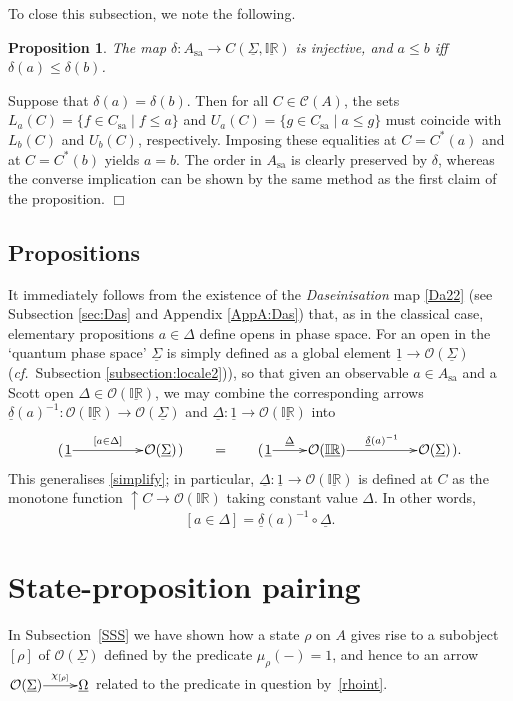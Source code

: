 \documentclass[11pt]{article}
\newcommand{\IR}{\mathbb{IR}}
\newcommand{\uIR}{\underline{\mathbb{IR}}}
\newcommand{\beq}{\begin{equation}}
\newcommand{\eeq}{\end{equation}}
\newcommand{\raw}{\rightarrow} \newcommand{\rat}{\mapsto}
\newcommand{\inv}{^{-1}}
\newcommand{\er}{\eqref}
\newcommand{\dl}{\delta} \newcommand{\Dl}{\Delta}
\newcommand{\rh}{\rho} \newcommand{\sg}{\sigma}
\newcommand{\ch}{\chi} \newcommand{\ps}{\psi} \newcommand{\Ps}{\Psi}
\newcommand{\CA}{{\mathcal A}} \newcommand{\CB}{{\mathcal B}}
\newcommand{\CO}{{\mathcal O}} \newcommand{\CP}{{\mathcal P}}
\newcommand{\alg}[1]{\ensuremath{#1}}
\newcommand{\functor}[1]{\ensuremath{\underline{#1}}}
\newcommand{\context}{\ensuremath{\mathcal{C}}}
\newcommand{\sa}{\ensuremath{_{\mathrm{sa}}}}
\renewcommand{\CA}{\mathcal{C}(A)}
\newcommand{\ulS}{\functor{\Sigma}}
\renewcommand{\CA}{\context(\alg{A})}
\newtheorem{proposition}[theorem]{Proposition}
\newenvironment{proof}[1][Proof]%
{ \begin{trivlist}%
  \item[\hskip \labelsep {\bfseries #1}]%
}%
{ \end{trivlist}%
}
\newcommand{\qed}{\nobreak\hfill$\Box$}
\begin{document}
 To close this subsection, we note the following.
\begin{proposition}
\label{prop:selfadjointsascuts}
  The map $\dl:A\sa\raw C(\ulS,\uIR)$ is injective, and
  $a\leqslant b$ iff $\dl(a)\leqslant\dl(b)$.
\end{proposition}
\begin{proof}
  Suppose that $\dl(a)=\dl(b)$. Then for all $\alg{C} \in\CA$,
  the sets $L_a(C)=\{f\in C\sa\mid f\leqslant a\}$ and $U_a(C)=\{g\in
  C\sa\mid a\leqslant g\}$ must coincide with $L_b(C)$ and $U_b(C)$, respectively.
  Imposing these equalities at $C=C^*(a)$ and at $C=C^*(b)$ yields $a=b$.
  The order in $A\sa$ is clearly preserved by $\dl$, whereas the
  converse implication can be shown by the same method as the first
  claim of the proposition.
  \qed
\end{proof}

\subsection{Propositions}
It immediately follows from the existence of the {\it Daseinisation} map \er{Da22} (see
Subsection \ref{sec:Das} and  Appendix \ref{AppA:Das})
that, as in the classical case, elementary propositions $a\in\Dl$
define opens in phase space. For an open in the `quantum phase space'
$\ulS$ is simply defined as a global element
$\underline{1}\raw\CO(\ulS)$ ({\it cf.}\ Subsection
\ref{subsection:locale2})), so that given an observable $a\in A\sa$ and
a Scott open $\Delta\in\CO(\uIR)$, we may combine the corresponding arrows
$\underline{\dl}(a)\inv:\CO(\uIR)\to\CO(\ulS)$ and
$\underline{\Delta}:\underline{1} \to \CO(\uIR)$
 into
\beq
 ( \xymatrix@1{\underline{1} \ar^-{[a\in\Dl]}[rr] && \CO(\ulS)})
  \qquad = \qquad
  (\xymatrix@1{\underline{1} \ar^-{\underline{\Delta}}[r] & \CO(\uIR)
  \ar^-{\underline{\dl}(a)\inv}[rr] && \CO(\ulS)}).
  \label{pijl}
\eeq
This generalises \er{simplify}; in particular, $\underline{\Delta}:\underline{1} \to \CO(\uIR)$ is
defined at $C$
as  the monotone function $\uparrow\!C\raw  \CO(\IR)$ taking constant value $\Delta$.
 In other words, 
\beq
  \label{eq:physicalproposition}
  [a\in\Dl]= \underline{\dl}(a)\inv\circ\underline{\Delta}.
\eeq

\section{State-proposition pairing}\label{Spp}

In Subsection~\ref{SSS} we have shown how a state $\rh$ on $A$ gives
rise to a subobject $[\rh]$ of $\CO(\ulS)$ defined by the predicate
$\mu_{\rho}(-)=1$, and hence to an arrow $\xymatrix@1{\CO(\ulS)
\ar^-{\ch_{[\rh]}}[r] & \functor{\Omega}}$ related to the predicate in
question by~\er{rhoint}.
\end{document}
